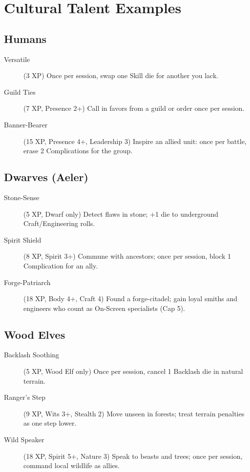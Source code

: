 \section{Cultural Talent Examples}

\subsection{Humans}

\begin{description}
\item[Versatile] (3 XP) Once per session, swap one Skill die for another you lack.
\item[Guild Ties] (7 XP, Presence 2+) Call in favors from a guild or order once per session.
\item[Banner-Bearer] (15 XP, Presence 4+, Leadership 3) Inspire an allied unit: once per battle, erase 2 Complications for the group.
\end{description}

\subsection{Dwarves (Aeler)}

\begin{description}
\item[Stone-Sense] (5 XP, Dwarf only) Detect flaws in stone; +1 die to underground Craft/Engineering rolls.
\item[Spirit Shield] (8 XP, Spirit 3+) Commune with ancestors; once per session, block 1 Complication for an ally.
\item[Forge-Patriarch] (18 XP, Body 4+, Craft 4) Found a forge-citadel; gain loyal smiths and engineers who count as On-Screen specialists (Cap 5).
\end{description}

\subsection{Wood Elves}

\begin{description}
\item[Backlash Soothing] (5 XP, Wood Elf only) Once per session, cancel 1 Backlash die in natural terrain.
\item[Ranger's Step] (9 XP, Wits 3+, Stealth 2) Move unseen in forests; treat terrain penalties as one step lower.
\item[Wild Speaker] (18 XP, Spirit 5+, Nature 3) Speak to beasts and trees; once per session, command local wildlife as allies.
\end{description}

